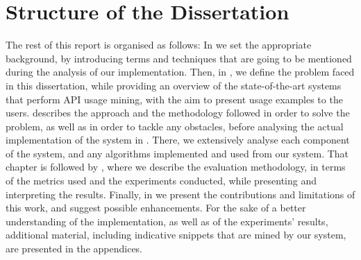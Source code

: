 \section{Structure of the Dissertation}
\label{sec:structure}

The rest of this report is organised as follows: In  we set the appropriate background, by introducing terms and techniques that are going to be mentioned during the analysis of our implementation. Then, in , we define the problem faced in this dissertation, while providing an overview of the state-of-the-art systems that perform API usage mining, with the aim to present usage examples to the users.  describes the approach and the methodology followed in order to solve the problem, as well as in order to tackle any obstacles, before analysing the actual implementation of the system in . There, we extensively analyse each component of the system, and any algorithms implemented and used from our system. That chapter is followed by , where we describe the evaluation methodology, in terms of the metrics used and the experiments conducted, while presenting and interpreting the results. Finally, in  we present the contributions and limitations of this work, and suggest possible enhancements. For the sake of a better understanding of the implementation, as well as of the experiments' results, additional material, including indicative snippets that are mined by our system, are presented in the appendices. 